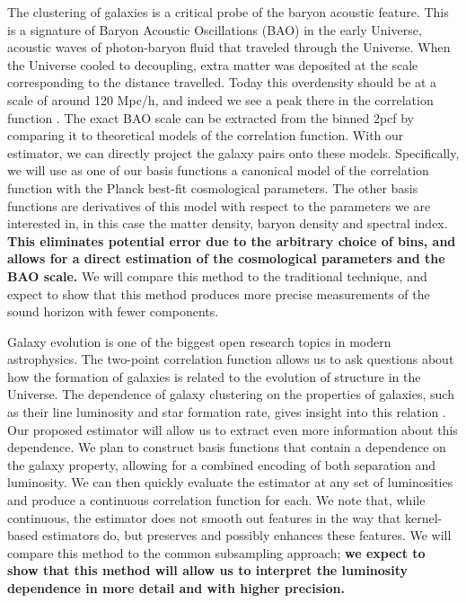 \documentclass[12pt, fullpage, letterpaper]{article}
\newcommand{\cf}{2pcf\xspace}
\begin{document}
The clustering of galaxies is a critical probe of the baryon acoustic feature. 
This is a signature of Baryon Acoustic Oscillations (BAO) in the early Universe, acoustic waves of photon-baryon fluid that traveled through the Universe. 
When the Universe cooled to decoupling, extra matter was deposited at the scale corresponding to the distance travelled. 
Today this overdensity should be at a scale of around 120 Mpc/h, and indeed we see a peak there in the correlation function \citep{Eisenstein2005}. 
The exact BAO scale can be extracted from the binned \cf by comparing it to theoretical models of the correlation function. 
With our estimator, we can directly project the galaxy pairs onto these models. 
Specifically, we will use as one of our basis functions a canonical model of the correlation function with the Planck best-fit cosmological parameters. 
The other basis functions are derivatives of this model with respect to the parameters we are interested in, in this case the matter density, baryon density and spectral index.
\textbf{This eliminates potential error due to the arbitrary choice of bins, and allows for a direct estimation of the cosmological parameters and the BAO scale.}
We will compare this method to the traditional technique, and expect to show that this method produces more precise measurements of the sound horizon with fewer components.

Galaxy evolution is one of the biggest open research topics in modern astrophysics.
The two-point correlation function allows us to ask questions about how the formation of galaxies is related to the evolution of structure in the Universe.
The dependence of galaxy clustering on the properties of galaxies, such as their line luminosity and star formation rate, gives insight into this relation \citep{Zehavi2004}.
Our proposed estimator will allow us to extract even more information about this dependence. 
We plan to construct basis functions that contain a dependence on the galaxy property, allowing for a combined encoding of both separation and luminosity. 
We can then quickly evaluate the estimator at any set of luminosities and produce a continuous correlation function for each. 
We note that, while continuous, the estimator does not smooth out features in the way that kernel-based estimators do, but preserves and possibly enhances these features.
We will compare this method to the common subsampling approach; \textbf{we expect to show that this method will allow us to interpret the luminosity dependence in more detail and with higher precision.}
\end{document}
